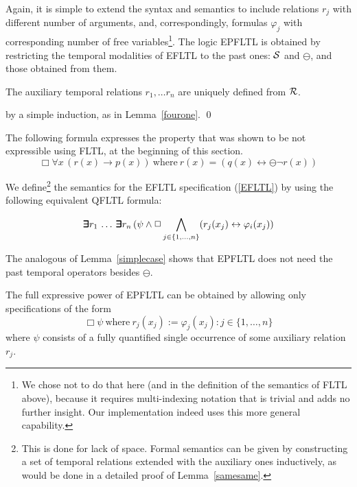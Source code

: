 Again, it
is simple to extend the syntax and semantics to include
relations $r_j$ with different number of arguments, and, correspondingly, formulas $\varphi_j$ with corresponding number of free
variables\footnote{We chose not to do that here (and in the definition of the semantics of FLTL above), because it
requires multi-indexing notation that is trivial and adds no further insight. Our implementation indeed uses
this more general capability.}.
The logic EPFLTL is obtained by restricting the temporal modalities of EFLTL to the past ones:
${\cal S}$ and $\ominus$, and those obtained from them.

\begin{lemma} \label{samesame}
The auxiliary temporal relations $r_1, \ldots r_n$ are
uniquely defined from ${\cal R}$.
\end{lemma}
 by a simple induction, as in Lemma~\ref{fourone}. \qed

The following formula expresses the property that was shown to be 
not expressible using FLTL, at the beginning of this section.
\begin{equation}
\Box \forall x \, (r(x)\rightarrow p(x)) \mathrm{\ where\ }
r(x) = ( q(x) \leftrightarrow \ominus \neg  r(x)) 
\label{eq:wolper-first-order}
\end{equation}

\noindent
We define\footnote{This is done for lack of space. Formal semantics 
can be given by constructing a set of temporal relations extended
with the auxiliary ones
inductively, as would be done in a detailed proof of Lemma~\ref{samesame}.} the semantics for the EFLTL 
specification (\ref{EFLTL}) 
by using the following equivalent
QFLTL formula:

\begin{equation} \label{equiv}
\bm{\exists}\kern-0.6em\bm{\exists} r_1  \, \ldots \, \bm{\exists}\kern-0.6em\bm{\exists} r_n \,  ( \psi \wedge \Box \bigwedge_{j \in \{ 1, \ldots , n\}} (r_j ( x_j )  \leftrightarrow 
\varphi_i ( x_j) )
\end{equation}

\noindent 
The analogous of Lemma~\ref{simplecase} shows that EPFLTL does not
need the past temporal operators besides $\ominus$.

\begin{lemma}
The full expressive power of EPFLTL can be obtained by allowing only 
specifications of the form
\[ \Box \psi \mathrm{\ where\ } r_j  ( x_j ) := 
\varphi_j (x_j) : j \in \{ 1 , \ldots , n \} \]
where $\psi$ consists of a fully quantified single occurrence of some
auxiliary relation $r_j$.
\end{lemma}

